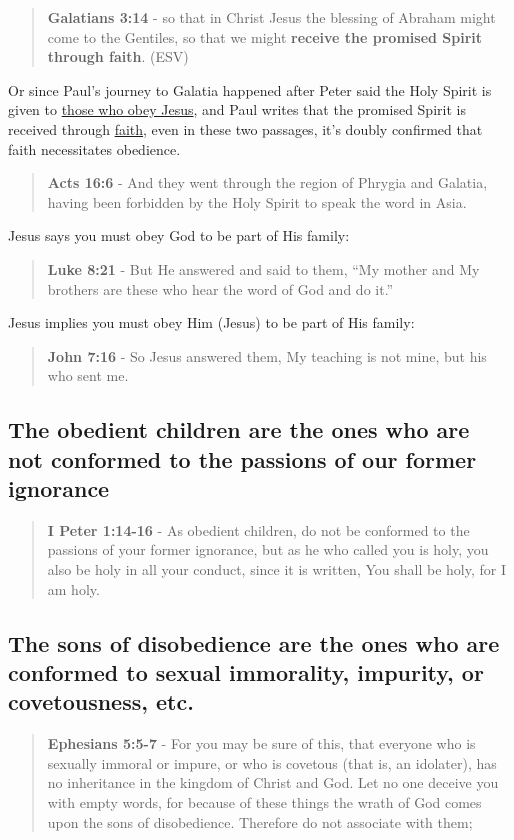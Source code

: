 \documentclass[11pt]{article}
\begin{document}
\begin{quote}
\textbf{Galatians 3:14} - so that in Christ Jesus the blessing of Abraham might come to the Gentiles, so that we might \textbf{receive the promised Spirit through faith}. (ESV)
\end{quote}

Or since Paul's journey to Galatia happened after Peter said the Holy Spirit is given to \uline{those who obey Jesus}, and Paul writes that the promised Spirit is received through \uline{faith}, even in these two passages, it's doubly confirmed that faith necessitates obedience.

\begin{quote}
\textbf{Acts 16:6} - And they went through the region of Phrygia and Galatia, having been forbidden by the Holy Spirit to speak the word in Asia.
\end{quote}

Jesus says you must obey God to be part of His family:

\begin{quote}
\textbf{Luke 8:21} - But He answered and said to them, “My mother and My brothers are these who hear the word of God and do it.”
\end{quote}

Jesus implies you must obey Him (Jesus) to be part of His family:

\begin{quote}
\textbf{John 7:16} - So Jesus answered them, My teaching is not mine, but his who sent me.
\end{quote}

\subsection{The obedient children are the ones who are not conformed to the passions of our former ignorance}
\label{sec:org90bfc9a}
\begin{quote}
\textbf{I Peter 1:14-16} - As obedient children, do not be conformed to the passions of your former ignorance, but as he who called you is holy, you also be holy in all your conduct, since it is written, You shall be holy, for I am holy.
\end{quote}

\subsection{The sons of disobedience are the ones who are conformed to sexual immorality, impurity, or covetousness, etc.}
\label{sec:orge9da8cc}
\begin{quote}
\textbf{Ephesians 5:5-7} - For you may be sure of this, that everyone who is sexually immoral or impure, or who is covetous (that is, an idolater), has no inheritance in the kingdom of Christ and God. Let no one deceive you with empty words, for because of these things the wrath of God comes upon the sons of disobedience. Therefore do not associate with them;
\end{quote}
\end{document}
